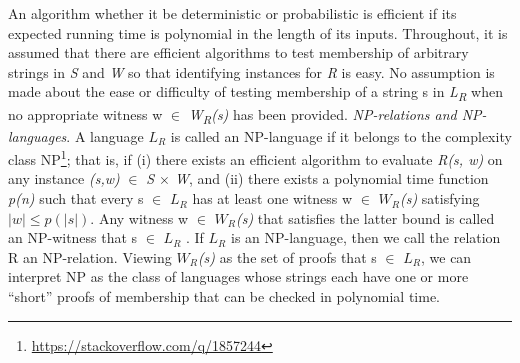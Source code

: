 \documentclass[a4paper]{article}
\newcommand{\quotes}[1]{``#1''}
\begin{document}
\newline
An algorithm whether it be deterministic or probabilistic is efficient if its expected running time is polynomial in the length of its inputs.
\newline
Throughout, it is assumed that there are efficient algorithms to test membership of arbitrary strings in \textit{S} and \textit{W} so that identifying instances for \textit{R} is easy. 
\newline
No assumption is made about the ease or difficulty of testing membership of a string s in \textit{L\textsubscript{R}} when no appropriate witness w $\in$ \textit{W\textsubscript{R}(s)} has been provided.
\newline
\newline
\textit{NP-relations and NP-languages}. A language \textit{$L_R$} is called an NP-language if it belongs to the complexity class NP\footnote{\url{https://stackoverflow.com/q/1857244}}; that is, if (i) there exists an efficient algorithm to evaluate \textit{R(s, w)} on any instance \textit{(s,w)} $\in$ \textit{S $\times$ W}, and (ii) there exists a polynomial time function \emph{p(n)} such that every s $\in$ \textit{$L_R$} has at least one witness w $\in$ \textit{$W_R$(s)} satisfying $|w|\leq p(|s|)$.
Any witness w $\in$ \textit{$W_R$(s)} that satisfies the latter bound is called an NP-witness that s $\in$ \textit{$L_R$} . If \textit{$L_R$} is an NP-language, then we call the relation R an NP-relation. Viewing \textit{$W_R$(s)} as the set of proofs that s $\in$ \textit{$L_R$}, we can interpret NP as the class of languages whose strings each have one or more \quotes{short} proofs of membership that can be checked in polynomial time.
\newline
\newline
\end{document}
